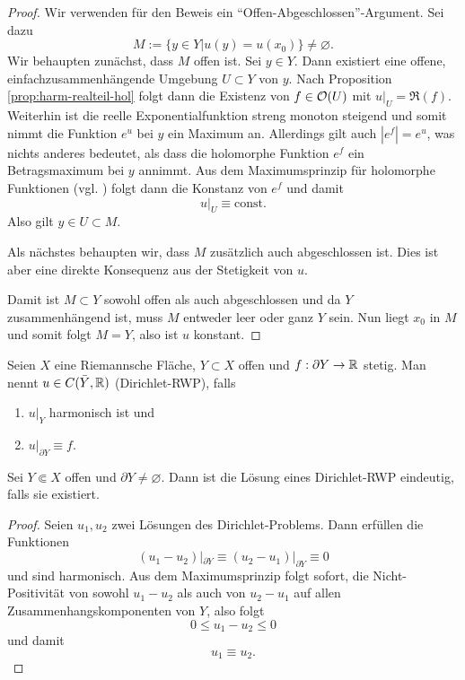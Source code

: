 \begin{proof}
  Wir verwenden für den Beweis ein
  "`Offen-Abgeschlossen"'-Argument. Sei dazu
  \[
  M:= \{ y \in Y| u(y) = u(x_0)\} \neq \varnothing.
  \]
  Wir behaupten zunächst, dass $M$ offen ist.
  Sei $y \in Y$. Dann existiert eine offene,
  einfachzusammenhängende Umgebung $U \subset Y$ von $y$. 
  Nach Proposition \ref{prop:harm-realteil-hol} folgt dann die
  Existenz von $f \in \mathcal{O}(U)$ mit $u|_U = \Re(f)$.
  Weiterhin ist die reelle Exponentialfunktion streng monoton
  steigend und somit nimmt die Funktion $e^u$ bei $y$ ein Maximum
  an. Allerdings gilt auch $|e^f| = e^u$, was nichts anderes
  bedeutet, als dass die holomorphe Funktion $e^f$ ein
  Betragsmaximum bei $y$ annimmt. 
  Aus dem Maximumsprinzip für holomorphe Funktionen (vgl. \cite[Kor. 2.6]{For}) folgt dann die
  Konstanz von $e^f$ und damit
  \[
  u|_U \equiv \text{const.}
  \]
  Also gilt $y \in U \subset M$.
  
  Als nächstes behaupten wir, dass $M$ zusätzlich auch abgeschlossen
  ist. Dies ist aber eine direkte Konsequenz aus der Stetigkeit von $u$.

  Damit ist $M \subset Y$ sowohl offen als auch abgeschlossen und da
  $Y$ zusammenhängend ist, muss $M$ entweder leer oder ganz $Y$
  sein. Nun liegt $x_0$ in $M$ und somit folgt $M = Y$, also ist $u$ konstant.
\end{proof}

\begin{defin}
  \label{defin:rwp}
  Seien $X$ eine Riemannsche Fläche, $Y\subset X$ offen und $f: \partial
  Y \rightarrow \mathbb{R}$ stetig. Man nennt $u \in C(\bar Y, \mathbb{R})$  (Dirichlet-RWP), falls
  \begin{enumerate}
  \item $u|_Y$ harmonisch ist und
  \item $u|_{\partial Y} \equiv f$.
  \end{enumerate}
\end{defin}

\begin{prop}
  \label{prop:dirichlet-eindeutig}
  Sei $Y \Subset X$ offen und $\partial Y \neq \varnothing$. Dann ist
  die Lösung eines Dirichlet-RWP eindeutig, falls sie existiert.
\end{prop}

\begin{proof}
  Seien $u_1, u_2$ zwei Lösungen des Dirichlet-Problems. Dann erfüllen
  die Funktionen
  \[
  (u_1 - u_2)|_{\partial Y} \equiv (u_2 - u_1)|_{\partial Y} \equiv 0
  \]
  und sind harmonisch. Aus dem Maximumsprinzip folgt sofort, die
  Nicht-Positivität von sowohl $u_1 - u_2$ als auch von $u_2 - u_1$
  auf allen Zusammenhangskomponenten von $Y$, also folgt
  \[
  0 \leq u_1 - u_2 \leq 0
  \]
  und damit
  \[
  u_1 \equiv u_2.
  \]
\end{proof}

